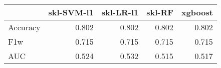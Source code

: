 \begin{tabular}{lrrrr}
\toprule
{} &  skl-SVM-l1 &  skl-LR-l1 &  skl-RF &  xgboost \\
\midrule
Accuracy &       0.802 &      0.802 &   0.802 &    0.802 \\
F1w      &       0.715 &      0.715 &   0.715 &    0.715 \\
AUC      &       0.524 &      0.532 &   0.515 &    0.517 \\
\bottomrule
\end{tabular}
